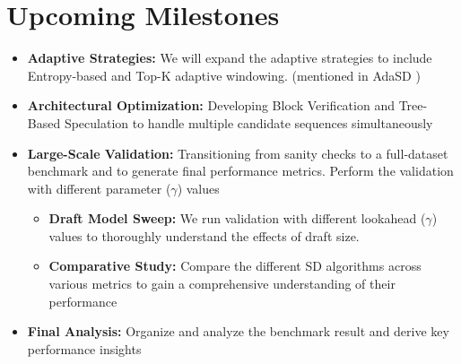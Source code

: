 \documentclass[11pt]{article}
\begin{document}
\section{Upcoming Milestones}
\begin{itemize}
    \item \textbf{Adaptive Strategies:} We will expand the adaptive strategies to include Entropy-based and Top-K adaptive windowing. (mentioned in AdaSD \cite{lu2025adasdadaptivespeculativedecoding})
    \item \textbf{Architectural Optimization:} Developing Block Verification \cite{sun2025blockverificationacceleratesspeculative} and Tree-Based Speculation \cite{Miao_2024} to handle multiple candidate sequences simultaneously
    \item \textbf{Large-Scale Validation:} Transitioning from sanity checks to a full-dataset benchmark and to generate final performance metrics. Perform the validation with different parameter ($\gamma$) values
    \begin{itemize}
        \item \textbf{Draft Model Sweep:} We run validation with different lookahead ($\gamma$) values to thoroughly understand the effects of draft size.
        \item \textbf{Comparative Study:} Compare the different SD algorithms across various metrics to gain a comprehensive understanding of their performance
    \end{itemize}
    \item \textbf{Final Analysis:} Organize and analyze the benchmark result and derive key performance insights
\end{itemize}

\nocite{*}

\printbibliography
\enlargethispage{1\baselineskip}
\end{document}
